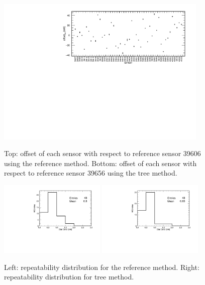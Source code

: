 \begin{figure}[htbp]
\centering
{\includegraphics[width=0.9\textwidth]{images/figure_13.pdf}}
\caption{Top: offset of each sensor with respect to reference sensor 39606 using the reference method. Bottom: offset of each sensor with respect to reference sensor 39656 using the tree method.}
\label{fig:offsets_tree_1}
\end{figure}

\begin{figure}[htbp]
\centering
{\includegraphics[width=0.45\textwidth]{images/figure_14_a.pdf}}
{\includegraphics[width=0.45\textwidth]{images/figure_14_b.pdf}}
\caption{Left: repeatability distribution for the reference method. Right: repeatability distribution for tree method.}
\label{fig:offsets_tree_2}
\end{figure}

